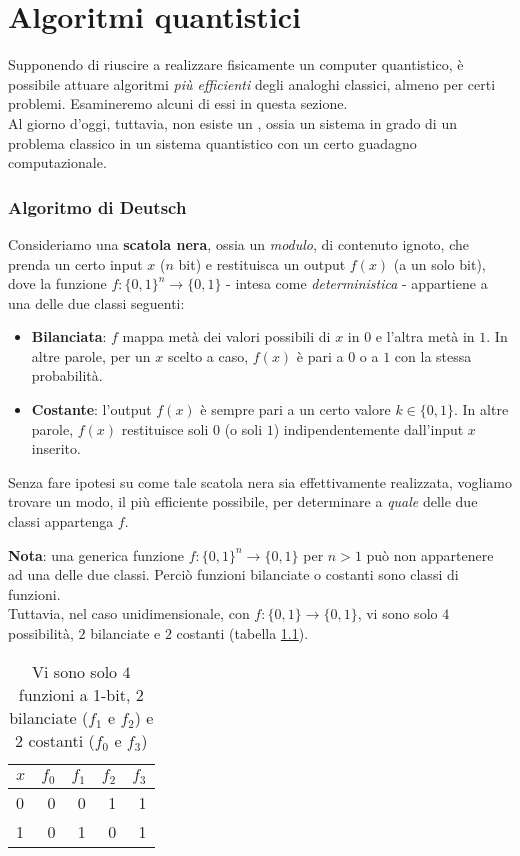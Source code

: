 \documentclass[../../InformazioneQuantistica.tex]{subfiles}
\begin{document}
\chapter{Algoritmi quantistici}

Supponendo di riuscire a realizzare fisicamente un computer quantistico, è possibile attuare algoritmi \textit{più efficienti} degli analoghi classici, almeno per certi problemi. Esamineremo alcuni di essi in questa sezione.\\
Al giorno d'oggi, tuttavia, non esiste un , ossia un sistema in grado di  un problema classico in un sistema quantistico con un certo guadagno computazionale.

\subsection{Algoritmo di Deutsch}
Consideriamo una \textbf{scatola nera}, ossia un \textit{modulo}, di contenuto ignoto, che prenda un certo input $x$ ($n$ bit) e restituisca un output $f(x)$ (a un solo bit), dove la funzione $f\colon \{0,1\}^n \to \{0,1\}$ - intesa come \textit{deterministica} - appartiene a una delle due classi seguenti:
\begin{itemize}
\item \textbf{Bilanciata}: $f$ mappa metà dei valori possibili di $x$ in $0$ e l'altra metà in $1$. In altre parole, per un $x$ scelto a caso, $f(x)$ è pari a $0$ o a $1$ con la stessa probabilità.
\item \textbf{Costante}: l'output $f(x)$ è sempre pari a un certo valore $k \in \{0,1\}$. In altre parole, $f(x)$ restituisce soli $0$ (o soli $1$) indipendentemente dall'input $x$ inserito.
\end{itemize}
Senza fare ipotesi su come tale scatola nera sia effettivamente realizzata, vogliamo trovare un modo, il più efficiente possibile, per determinare a \textit{quale} delle due classi appartenga $f$.

\textbf{Nota}: una generica funzione $f\colon \{0,1\}^n \to \{0,1\}$ per $n>1$ può non appartenere ad una delle due classi. Perciò funzioni bilanciate o costanti sono classi  di funzioni.\\
Tuttavia, nel caso unidimensionale, con $f\colon \{0,1\} \to \{0,1\}$, vi sono solo $4$ possibilità, $2$ bilanciate e $2$ costanti (tabella \ref{tab:one-bit}).

\begin{table}[H]
\centering
\begin{tabular}{@{}l|rrrr@{}}
\toprule
\multicolumn{1}{c|}{$x$} & \multicolumn{1}{c}{$f_0$} & \multicolumn{1}{c}{$f_1$} & \multicolumn{1}{c}{$f_2$} & \multicolumn{1}{c}{$f_3$} \\ \midrule
0 & 0 & 0 & 1 & 1 \\
1 & 0 & 1 & 0 & 1 \\ \bottomrule
\end{tabular}
\caption{Vi sono solo $4$ funzioni a 1-bit, $2$ bilanciate ($f_1$ e $f_2$) e $2$ costanti ($f_0$ e $f_3$)}
\label{tab:one-bit}
\end{table}
\end{document}
